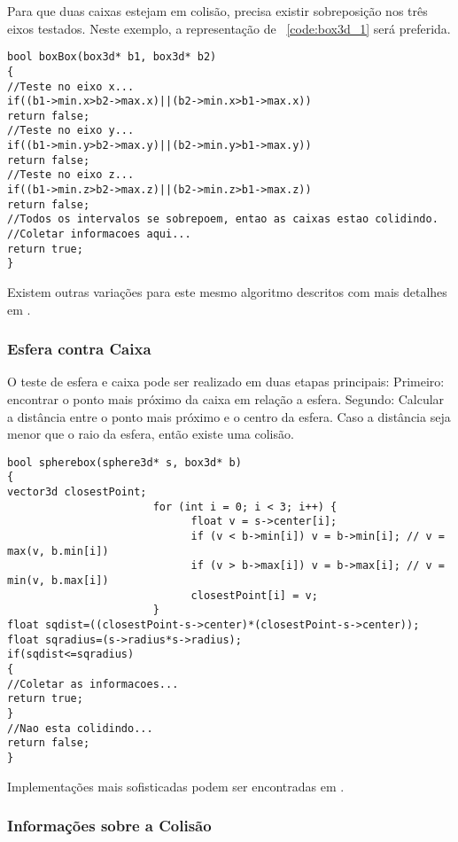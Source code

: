 Para que duas caixas estejam em colisão, precisa existir sobreposição nos três
eixos testados.
Neste exemplo, a representação de ~\ref{code:box3d_1} será preferida.

\begin{lstlisting}[frame=single,caption=Colisão entre caixas\label{code:collisionBoxBox}]
bool boxBox(box3d* b1, box3d* b2)
{
//Teste no eixo x...
if((b1->min.x>b2->max.x)||(b2->min.x>b1->max.x))
return false;
//Teste no eixo y...
if((b1->min.y>b2->max.y)||(b2->min.y>b1->max.y))
return false;
//Teste no eixo z...
if((b1->min.z>b2->max.z)||(b2->min.z>b1->max.z))
return false;
//Todos os intervalos se sobrepoem, entao as caixas estao colidindo.
//Coletar informacoes aqui...
return true;
}
\end{lstlisting}

Existem outras variações para este mesmo algoritmo descritos com mais detalhes
em .

\subsubsection{Esfera contra Caixa}

O teste de esfera e caixa pode ser realizado em duas etapas principais:
Primeiro: encontrar o ponto mais próximo da caixa em relação a esfera.
Segundo: Calcular a distância entre o ponto mais próximo e o centro da esfera.
Caso a distância seja menor que o raio da esfera, então existe uma colisão.

\begin{lstlisting}[frame=single,caption=Colisão entre esfera e caixa\label{code:collisionSphereBox}]
bool spherebox(sphere3d* s, box3d* b)
{
vector3d closestPoint;
                       for (int i = 0; i < 3; i++) {
                             float v = s->center[i];
                             if (v < b->min[i]) v = b->min[i]; // v = max(v, b.min[i])
                             if (v > b->max[i]) v = b->max[i]; // v = min(v, b.max[i])
                             closestPoint[i] = v;
                       }
float sqdist=((closestPoint-s->center)*(closestPoint-s->center));
float sqradius=(s->radius*s->radius);
if(sqdist<=sqradius)
{
//Coletar as informacoes...
return true;
}
//Nao esta colidindo...
return false;
}
\end{lstlisting}

Implementações mais sofisticadas podem ser encontradas em .

\subsubsection{Informações sobre a Colisão}

